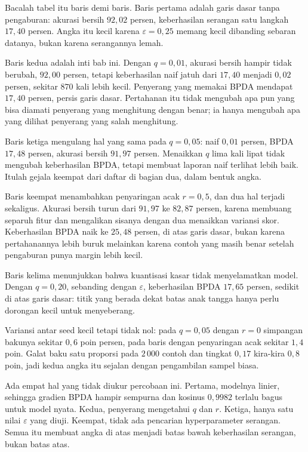 Bacalah tabel itu baris demi baris. Baris pertama adalah garis dasar tanpa pengaburan:
akurasi bersih $92{,}02$ persen, keberhasilan serangan satu langkah $17{,}40$ persen.
Angka itu kecil karena $\varepsilon=0{,}25$ memang kecil dibanding sebaran datanya,
bukan karena serangannya lemah.

Baris kedua adalah inti bab ini. Dengan $q=0{,}01$, akurasi bersih hampir tidak berubah,
$92{,}00$ persen, tetapi keberhasilan naif jatuh dari $17{,}40$ menjadi $0{,}02$ persen,
sekitar $870$ kali lebih kecil. Penyerang yang memakai BPDA mendapat $17{,}40$ persen,
persis garis dasar. Pertahanan itu tidak mengubah apa pun yang bisa diamati penyerang
yang menghitung dengan benar; ia hanya mengubah apa yang dilihat penyerang yang salah
menghitung.

Baris ketiga mengulang hal yang sama pada $q=0{,}05$: naif $0{,}01$ persen, BPDA
$17{,}48$ persen, akurasi bersih $91{,}97$ persen. Menaikkan $q$ lima kali lipat tidak
mengubah keberhasilan BPDA, tetapi membuat laporan naif terlihat lebih baik. Itulah
gejala keempat dari daftar di bagian dua, dalam bentuk angka.

Baris keempat menambahkan penyaringan acak $r=0{,}5$, dan dua hal terjadi sekaligus.
Akurasi bersih turun dari $91{,}97$ ke $82{,}87$ persen, karena membuang separuh fitur dan
mengalikan sisanya dengan dua menaikkan variansi skor. Keberhasilan BPDA naik ke $25{,}48$
persen, di atas garis dasar, bukan karena pertahanannya lebih buruk melainkan karena contoh
yang masih benar setelah pengaburan punya margin lebih kecil.

Baris kelima menunjukkan bahwa kuantisasi kasar tidak menyelamatkan model. Dengan
$q=0{,}20$, sebanding dengan $\varepsilon$, keberhasilan BPDA $17{,}65$ persen, sedikit di
atas garis dasar: titik yang berada dekat batas anak tangga hanya perlu dorongan kecil untuk
menyeberang.

Variansi antar seed kecil tetapi tidak nol: pada $q=0{,}05$ dengan $r=0$ simpangan bakunya
sekitar $0{,}6$ poin persen, pada baris dengan penyaringan acak sekitar $1{,}4$ poin. Galat
baku satu proporsi pada $2\,000$ contoh dan tingkat $0{,}17$ kira-kira $0{,}8$ poin, jadi
kedua angka itu sejalan dengan pengambilan sampel biasa.

Ada empat hal yang tidak diukur percobaan ini. Pertama, modelnya linier, sehingga gradien
BPDA hampir sempurna dan kosinus $0{,}9982$ terlalu bagus untuk model nyata. Kedua,
penyerang mengetahui $q$ dan $r$. Ketiga, hanya satu nilai $\varepsilon$ yang diuji.
Keempat, tidak ada pencarian hyperparameter serangan. Semua itu membuat angka di atas
menjadi batas bawah keberhasilan serangan, bukan batas atas.


